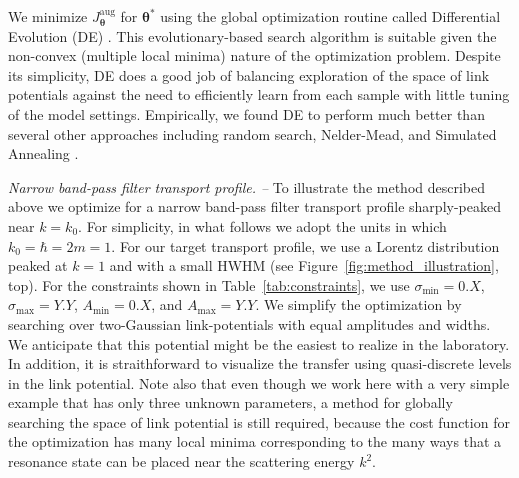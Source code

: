 \documentclass[twocolumn,amsmath,amssymb,showpacs,prl,superscriptaddress,aps]{revtex4-1}
\begin{document}
 We minimize $J_{\bm{\theta}}^{\mathrm{aug}}$ for $\bm{\theta}^*$ using the global optimization routine called Differential Evolution (DE) \cite{original DE paper}. This evolutionary-based search algorithm is suitable given the non-convex (multiple local minima) nature of the optimization problem. Despite its simplicity, DE does a good job of balancing exploration of the space of link potentials against the need to efficiently learn from each sample with little tuning of the model settings. Empirically, we found DE to perform much better than several other approaches including random search, Nelder-Mead, and Simulated Annealing \cite{Tests performed using mathematica}.



{\it Narrow band-pass filter transport profile. --}
To illustrate the method described above we optimize for a narrow band-pass filter transport profile sharply-peaked near $k=k_0$. {\color{green} For simplicity, in what follows we adopt the units in which $k_0=\hbar=2m=1$}. For our target transport profile, we use a Lorentz distribution peaked at $k=1$ and with a small {\color{red} HWHM} (see Figure~\ref{fig:method_illustration}, top). For the constraints shown in Table~\ref{tab:constraints}, {\color{red} we use $\sigma_{\mathrm{min}}=0.X$, $\sigma_{\mathrm{max}}=Y.Y$, $A_{\mathrm{min}}=0.X$, and $A_{\mathrm{max}}=Y.Y$}. We simplify the optimization by searching over two-Gaussian link-potentials with equal amplitudes and widths.
{\color{green} We anticipate that this potential might be the easiest to realize in the laboratory. In addition, it is straithforward to visualize the transfer using quasi-discrete levels 
in the link potential. 
Note also that even though we work here with a very simple example that has only three unknown parameters, a method for globally searching the space of link potential is still required, because
the cost function for the optimization has many local minima corresponding to the many ways that a resonance state can be placed near the scattering energy $k^2$. }
\end{document}
